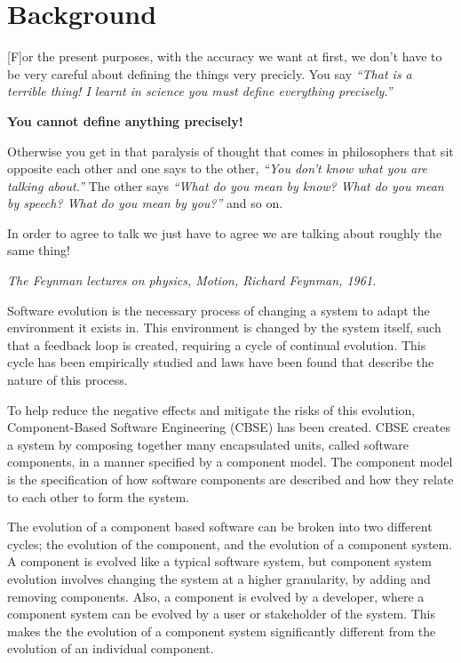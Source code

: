 \chapter{Background}
\label{background}
\epigraph{[F]or the present purposes, with the accuracy we want at first, we don't have to be very careful about defining the things very precicly.
You say \textit{``That is a terrible thing! I learnt in science you must define everything precisely.''}

\textbf{You cannot define anything precisely!} 

Otherwise you get in that paralysis of thought that comes in philosophers that sit opposite each other and one says to the other,
\textit{``You don't know what you are talking about.''} 
The other says \textit{``What do you mean by know? What do you mean by speech? What do you mean by you?''} and so on.

In order to agree to talk we just have to agree we are talking about roughly the same thing!}
{\textit{The Feynman lectures on physics, Motion, Richard Feynman, 1961.}}

Software evolution is the necessary process of changing a system to adapt the environment it exists in.
This environment is changed by the system itself, such that a feedback loop \cite{lehman1980} is created, requiring a cycle of continual evolution.
This cycle has been empirically studied and laws have been found that describe the nature of this process.  

To help reduce the negative effects and mitigate the risks of this evolution, Component-Based Software Engineering (CBSE) has been created. 
CBSE creates a system by composing together many encapsulated units, called software components, in a manner specified by a component model.
The component model is the specification of how software components are described and how they relate to each other to form the system.

The evolution of a component based software can be broken into two different cycles; the evolution of the component, and the evolution of a component system. 
A component is evolved like a typical software system, 
but component system evolution involves changing the system at a higher granularity, by adding and removing components.
Also, a component is evolved by a developer, where a component system can be evolved by a user or stakeholder of the system.
This makes the the evolution of a component system significantly different from the evolution of an individual component.

